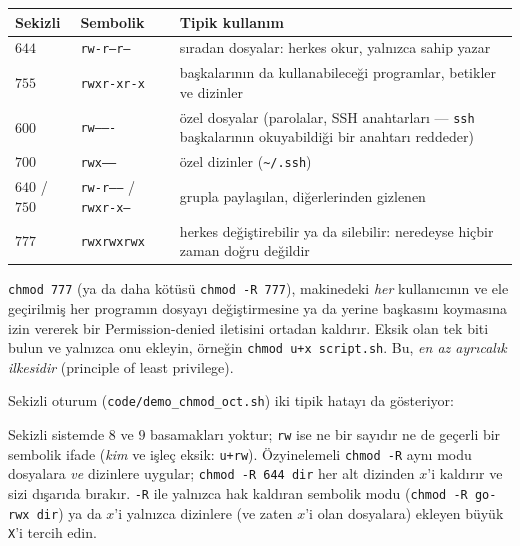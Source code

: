 \documentclass[11pt,a4paper]{article}
\newcommand{\cmd}[1]{\texttt{#1}}
\begin{document}
\begin{center}
\small
\begin{tabularx}{\linewidth}{@{}l l X@{}}
\toprule
\textbf{Sekizli} & \textbf{Sembolik} & \textbf{Tipik kullanım} \\
\midrule
$644$ & \texttt{rw-r--r--} & sıradan dosyalar: herkes okur, yalnızca sahip yazar \\
$755$ & \texttt{rwxr-xr-x} & başkalarının da kullanabileceği programlar, betikler ve dizinler \\
$600$ & \texttt{rw-------} & özel dosyalar (parolalar, SSH anahtarları --- \cmd{ssh} başkalarının okuyabildiği bir anahtarı reddeder) \\
$700$ & \texttt{rwx------} & özel dizinler (\texttt{\textasciitilde/.ssh}) \\
$640$ / $750$ & \texttt{rw-r-----} / \texttt{rwxr-x---} & grupla paylaşılan, diğerlerinden gizlenen \\
$777$ & \texttt{rwxrwxrwx} & herkes değiştirebilir ya da silebilir: neredeyse hiçbir zaman doğru değildir \\
\bottomrule
\end{tabularx}
\end{center}

\begin{keyidea}
\texttt{chmod 777} (ya da daha kötüsü \texttt{chmod -R 777}), makinedeki \emph{her} kullanıcının ve ele geçirilmiş her programın dosyayı değiştirmesine ya da yerine başkasını koymasına izin vererek bir Permission-denied iletisini ortadan kaldırır. Eksik olan tek biti bulun ve yalnızca onu ekleyin, örneğin \texttt{chmod u+x script.sh}. Bu, \emph{en az ayrıcalık ilkesidir} (principle of least privilege).
\end{keyidea}

Sekizli oturum (\cmd{code/demo\_chmod\_oct.sh}) iki tipik hatayı da gösteriyor:



Sekizli sistemde $8$ ve $9$ basamakları yoktur; \texttt{rw} ise ne bir sayıdır ne de geçerli bir sembolik ifade (\emph{kim} ve işleç eksik: \texttt{u+rw}). Özyinelemeli \cmd{chmod -R} aynı modu dosyalara \emph{ve} dizinlere uygular; \texttt{chmod -R 644 dir} her alt dizinden $x$'i kaldırır ve sizi dışarıda bırakır. \texttt{-R} ile yalnızca hak kaldıran sembolik modu (\texttt{chmod -R go-rwx dir}) ya da $x$'i yalnızca dizinlere (ve zaten $x$'i olan dosyalara) ekleyen büyük \texttt{X}'i tercih edin.
\end{document}
